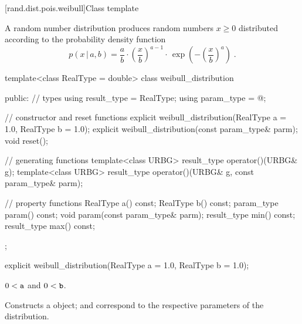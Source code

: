 
[rand.dist.pois.weibull]{Class template }%
%
%

\pnum
A  random number distribution
produces random numbers $x \geq 0$
distributed according to
the probability density function%
%
%
\[%
 p(x\,|\,a,b)
      =       \frac{a}{b}
        \cdot \left(\frac{x}{b}\right)^{a-1}
        \cdot \, \exp\left( -\left(\frac{x}{b}\right)^a\right)
\; \mbox{.}
\]

%
\begin{codeblock}
template<class RealType = double>
  class weibull_distribution {
  public:
    // types
    using result_type = RealType;
    using param_type  = @\unspec@;

    // constructor and reset functions
    explicit weibull_distribution(RealType a = 1.0, RealType b = 1.0);
    explicit weibull_distribution(const param_type& parm);
    void reset();

    // generating functions
    template<class URBG>
      result_type operator()(URBG& g);
    template<class URBG>
      result_type operator()(URBG& g, const param_type& parm);

    // property functions
    RealType a() const;
    RealType b() const;
    param_type param() const;
    void param(const param_type& parm);
    result_type min() const;
    result_type max() const;
  };
\end{codeblock}

%
\begin{itemdecl}
explicit weibull_distribution(RealType a = 1.0, RealType b = 1.0);
\end{itemdecl}%

\begin{itemdescr}
\pnum\requires
 $ 0 < \texttt{a} $ and  $ 0 < \texttt{b} $.

\pnum\effects Constructs a  object;
  and 
 correspond to the respective parameters of the distribution.
\end{itemdescr}

